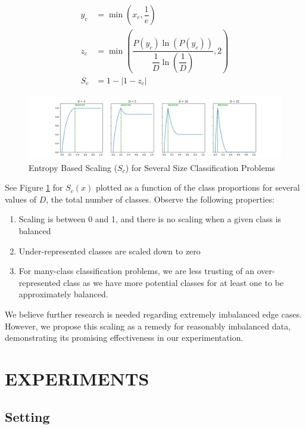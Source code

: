 \documentclass{article} %
\begin{document}
\begin{align}
    y_c &= \min \left( x_c, \dfrac{1}{e} \right) \\
    z_c &= \min \left( \dfrac{P(y_c) \ln \left( P(y_c) \right)}{\dfrac{1}{D} \ln \left( \dfrac{1}{D} \right)}, 2 \right) \\
    S_c &= 1 - | 1 - z_c |    
\end{align}

\begin{figure}[h]
    \centering
    \includegraphics[width=\textwidth]{article/99_visuals/scaling.png}
    \caption{Entropy Based Scaling ($S_c$) for Several Size Classification Problems}
    \label{fig:scaling}
\end{figure}

See Figure \ref{fig:scaling} for $S_c(x)$ plotted as a function of the class proportions for several values of $D$, the total number of classes. Observe the following  properties:
\begin{enumerate}
    \item Scaling is between 0 and 1, and there is no scaling when a given class is balanced
    \item Under-represented classes are scaled down to zero
    \item For many-class classification problems, we are less trusting of an over-represented class as we have more potential classes for at least one to be approximately balanced.
\end{enumerate}

We believe further research is needed regarding extremely imbalanced edge cases. However, we propose this scaling as a remedy for reasonably imbalanced data, demonstrating its promising effectiveness in our experimentation.

\section{EXPERIMENTS}

%
\subsection{Setting}
\end{document}
